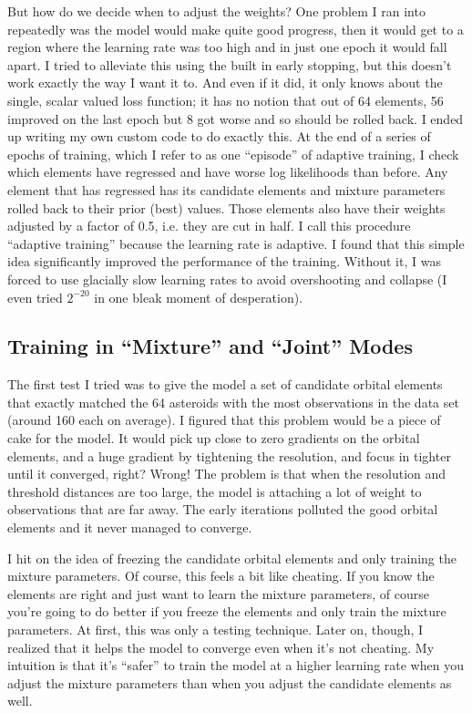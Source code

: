 But how do we decide when to adjust the weights?
One problem I ran into repeatedly was the model would make quite good progress, 
then it would get to a region where the learning rate was too high and in just one epoch it would fall apart.
I tried to alleviate this using the built in early stopping, but this doesn't work exactly the way I want it to.
And even if it did, it only knows about the single, scalar valued loss function;
it has no notion that out of 64 elements, 56 improved on the last epoch but 8 got worse and so should be rolled back.
I ended up writing my own custom code to do exactly this.
At the end of a series of epochs of training, which I refer to as one ``episode'' of adaptive training,
I check which elements have regressed and have worse log likelihoods than before.
Any element that has regressed has its candidate elements and mixture parameters rolled back to their prior (best) values.
Those elements also have their weights adjusted by a factor of 0.5, i.e. they are cut in half.
I call this procedure ``adaptive training'' because the learning rate is adaptive.
I found that this simple idea significantly improved the performance of the training.
Without it, I was forced to use glacially slow learning rates to avoid overshooting and collapse (I even tried $2^{-20}$ in one bleak moment of desperation).

\subsection{Training in ``Mixture'' and ``Joint'' Modes}
The first test I tried was to give the model a set of candidate orbital elements that exactly 
matched the 64 asteroids with the most observations in the data set (around 160 each on average).
I figured that this problem would be a piece of cake for the model.
It would pick up close to zero gradients on the orbital elements, and a huge gradient by tightening the resolution,
and focus in tighter until it converged, right?
Wrong! The problem is that when the resolution and threshold distances are too large, 
the model is attaching a lot of weight to observations that are far away.
The early iterations polluted the good orbital elements and it never managed to converge.

I hit on the idea of freezing the candidate orbital elements and only training the mixture parameters.
Of course, this feels a bit like cheating.  
If you know the elements are right and just want to learn the mixture parameters, 
of course you're going to do better if you freeze the elements and only train the mixture parameters.
At first, this was only a testing technique.
Later on, though, I realized that it helps the model to converge even when it's not cheating.
My intuition is that it's ``safer'' to train the model at a higher learning rate when you adjust 
the mixture parameters than when you adjust the candidate elements as well.

